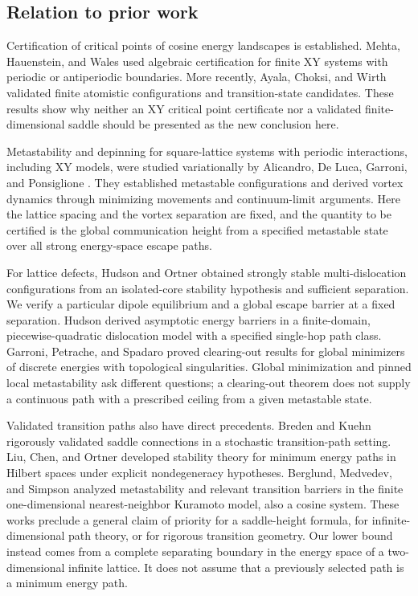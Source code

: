 \subsection{Relation to prior work}

Certification of critical points of cosine energy landscapes is established. Mehta, Hauenstein, and Wales \cite{Mehta2014} used algebraic certification for finite XY systems with periodic or antiperiodic boundaries. More recently, Ayala, Choksi, and Wirth \cite{Ayala2026} validated finite atomistic configurations and transition-state candidates. These results show why neither an XY critical point certificate nor a validated finite-dimensional saddle should be presented as the new conclusion here.

Metastability and depinning for square-lattice systems with periodic interactions, including XY models, were studied variationally by Alicandro, De Luca, Garroni, and Ponsiglione \cite{Alicandro2014}. They established metastable configurations and derived vortex dynamics through minimizing movements and continuum-limit arguments. Here the lattice spacing and the vortex separation are fixed, and the quantity to be certified is the global communication height from a specified metastable state over all strong energy-space escape paths.

For lattice defects, Hudson and Ortner \cite{Hudson2015} obtained strongly stable multi-dislocation configurations from an isolated-core stability hypothesis and sufficient separation. We verify a particular dipole equilibrium and a global escape barrier at a fixed separation. Hudson \cite{Hudson2017} derived asymptotic energy barriers in a finite-domain, piecewise-quadratic dislocation model with a specified single-hop path class. Garroni, Petrache, and Spadaro \cite{Garroni2025} proved clearing-out results for global minimizers of discrete energies with topological singularities. Global minimization and pinned local metastability ask different questions; a clearing-out theorem does not supply a continuous path with a prescribed ceiling from a given metastable state.

Validated transition paths also have direct precedents. Breden and Kuehn \cite{Breden2019} rigorously validated saddle connections in a stochastic transition-path setting. Liu, Chen, and Ortner \cite{Liu2024} developed stability theory for minimum energy paths in Hilbert spaces under explicit nondegeneracy hypotheses. Berglund, Medvedev, and Simpson \cite{Berglund2025} analyzed metastability and relevant transition barriers in the finite one-dimensional nearest-neighbor Kuramoto model, also a cosine system. These works preclude a general claim of priority for a saddle-height formula, for infinite-dimensional path theory, or for rigorous transition geometry. Our lower bound instead comes from a complete separating boundary in the energy space of a two-dimensional infinite lattice. It does not assume that a previously selected path is a minimum energy path.

